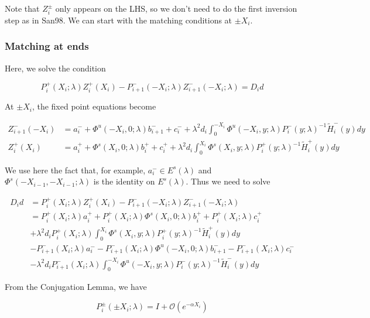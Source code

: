 \documentclass[12pt]{article}
\begin{document}
Note that $Z_i^\pm$ only appears on the LHS, so we don't need to do the first inversion step as in San98. We can start with the matching conditions at $\pm X_i$.

\subsubsection*{Matching at ends}

Here, we solve the condition

\[
P_i^+(X_i; \lambda) Z_i^+(X_i) - P_{i+1}^-(-X_i; \lambda) Z_{i+1}^-(-X_i; \lambda) = D_i d
\]

At $\pm X_i$, the fixed point equations become

\begin{align*}
Z_{i+1}^-(-X_i) &= a_i^- + \Phi^u(-X_i, 0; \lambda) b_{i+1}^- + c_i^- 
+ \lambda^2 d_i \int_0^{-X_i} \Phi^u(-X_i, y; \lambda) P_i^-(y; \lambda)^{-1} \tilde{H}_i^-(y) dy \\ 
Z_i^+(X_i) &= a_i^+ + \Phi^s(X_i, 0; \lambda) b_i^+ + c_i^+ 
+ \lambda^2 d_i \int_0^{X_i} \Phi^s(X_i, y; \lambda) P_i^+(y; \lambda)^{-1} \tilde{H}_i^+(y) dy
\end{align*}

We use here the fact that, for example, $a_i^- \in E^s(\lambda)$ and $\Phi^s(-X_{i-1}, -X_{i-1}; \lambda)$ is the identity on $E^s(\lambda)$. Thus we need to solve

\begin{align*}
D_i d &= P_i^+(X_i; \lambda) Z_i^+(X_i) - P_{i+1}^-(-X_i; \lambda) Z_{i+1}^-(-X_i; \lambda) \\
&= P_i^+(X_i; \lambda) a_i^+ + P_i^+(X_i; \lambda) \Phi^s(X_i, 0; \lambda) b_i^+ + P_i^+(X_i; \lambda) c_i^+ \\
&+ \lambda^2 d_i P_i^+(X_i; \lambda) \int_0^{X_i} \Phi^s(X_i, y; \lambda) P_i^+(y; \lambda)^{-1} \tilde{H}_i^+(y) dy \\
&- P_{i+1}^-(X_i; \lambda) a_i^- - P_{i+1}^-(X_i; \lambda) \Phi^u(-X_i, 0; \lambda) b_{i+1}^- - P_{i+1}^-(X_i; \lambda) c_i^- \\
&- \lambda^2 d_i P_{i+1}^-(X_i; \lambda) \int_0^{-X_i} \Phi^u(-X_i, y; \lambda) P_i^-(y; \lambda)^{-1} \tilde{H}_i^-(y) dy 
\end{align*}

From the Conjugation Lemma, we have

\begin{equation}\label{conjest}
P_i^\pm(\pm X_i; \lambda) = I + \mathcal{O}(e^{-\alpha X_i})
\end{equation}
\end{document}
